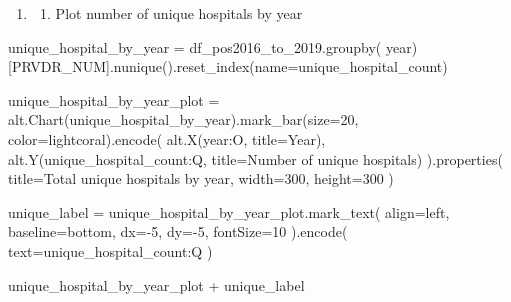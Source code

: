 \documentclass[
  letterpaper,
  DIV=11,
  numbers=noendperiod]{scrartcl}
\newenvironment{Shaded}{\begin{snugshade}}{\end{snugshade}}
\newcommand{\DecValTok}[1]{\textcolor[rgb]{0.68,0.00,0.00}{#1}}
\newcommand{\NormalTok}[1]{\textcolor[rgb]{0.00,0.23,0.31}{#1}}
\newcommand{\OperatorTok}[1]{\textcolor[rgb]{0.37,0.37,0.37}{#1}}
\newcommand{\StringTok}[1]{\textcolor[rgb]{0.13,0.47,0.30}{#1}}
\providecommand{\tightlist}{%
  \setlength{\itemsep}{0pt}\setlength{\parskip}{0pt}}\usepackage{longtable,booktabs,array}
\begin{document}
\begin{enumerate}
\def\labelenumi{\arabic{enumi}.}
\setcounter{enumi}{3}
\tightlist
\item
  \begin{enumerate}
  \def\labelenumii{\alph{enumii}.}
  \tightlist
  \item
    Plot number of unique hospitals by year
  \end{enumerate}
\end{enumerate}

\begin{Shaded}
\begin{Highlighting}[]
\NormalTok{unique\_hospital\_by\_year }\OperatorTok{=}\NormalTok{ df\_pos2016\_to\_2019.groupby(}
    \StringTok{\textquotesingle{}year\textquotesingle{}}\NormalTok{)[}\StringTok{\textquotesingle{}PRVDR\_NUM\textquotesingle{}}\NormalTok{].nunique().reset\_index(name}\OperatorTok{=}\StringTok{\textquotesingle{}unique\_hospital\_count\textquotesingle{}}\NormalTok{)}

\NormalTok{unique\_hospital\_by\_year\_plot }\OperatorTok{=}\NormalTok{ alt.Chart(unique\_hospital\_by\_year).mark\_bar(size}\OperatorTok{=}\DecValTok{20}\NormalTok{, color}\OperatorTok{=}\StringTok{\textquotesingle{}lightcoral\textquotesingle{}}\NormalTok{).encode(}
\NormalTok{    alt.X(}\StringTok{\textquotesingle{}year:O\textquotesingle{}}\NormalTok{, title}\OperatorTok{=}\StringTok{\textquotesingle{}Year\textquotesingle{}}\NormalTok{),}
\NormalTok{    alt.Y(}\StringTok{\textquotesingle{}unique\_hospital\_count:Q\textquotesingle{}}\NormalTok{, title}\OperatorTok{=}\StringTok{\textquotesingle{}Number of unique hospitals\textquotesingle{}}\NormalTok{)}
\NormalTok{).properties(}
\NormalTok{    title}\OperatorTok{=}\StringTok{\textquotesingle{}Total unique hospitals by year\textquotesingle{}}\NormalTok{,}
\NormalTok{    width}\OperatorTok{=}\DecValTok{300}\NormalTok{,}
\NormalTok{    height}\OperatorTok{=}\DecValTok{300}
\NormalTok{)}

\NormalTok{unique\_label }\OperatorTok{=}\NormalTok{ unique\_hospital\_by\_year\_plot.mark\_text(}
\NormalTok{    align}\OperatorTok{=}\StringTok{\textquotesingle{}left\textquotesingle{}}\NormalTok{,}
\NormalTok{    baseline}\OperatorTok{=}\StringTok{\textquotesingle{}bottom\textquotesingle{}}\NormalTok{,}
\NormalTok{    dx}\OperatorTok{={-}}\DecValTok{5}\NormalTok{,}
\NormalTok{    dy}\OperatorTok{={-}}\DecValTok{5}\NormalTok{,}
\NormalTok{    fontSize}\OperatorTok{=}\DecValTok{10}
\NormalTok{).encode(}
\NormalTok{    text}\OperatorTok{=}\StringTok{\textquotesingle{}unique\_hospital\_count:Q\textquotesingle{}}
\NormalTok{)}

\NormalTok{unique\_hospital\_by\_year\_plot }\OperatorTok{+}\NormalTok{ unique\_label}
\end{Highlighting}
\end{Shaded}
\end{document}

